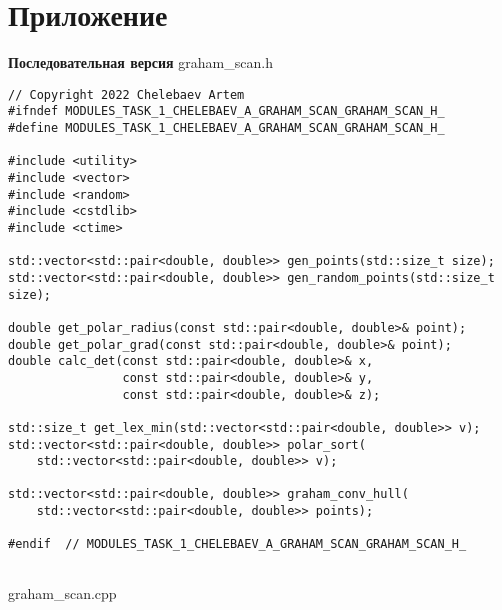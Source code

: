 \documentclass{report}
\begin{document}
\section*{Приложение}
\textbf{Последовательная версия}
\newline
\newline graham\_scan.h
\begin{lstlisting}
// Copyright 2022 Chelebaev Artem
#ifndef MODULES_TASK_1_CHELEBAEV_A_GRAHAM_SCAN_GRAHAM_SCAN_H_
#define MODULES_TASK_1_CHELEBAEV_A_GRAHAM_SCAN_GRAHAM_SCAN_H_

#include <utility>
#include <vector>
#include <random>
#include <cstdlib>
#include <ctime>

std::vector<std::pair<double, double>> gen_points(std::size_t size);
std::vector<std::pair<double, double>> gen_random_points(std::size_t size);

double get_polar_radius(const std::pair<double, double>& point);
double get_polar_grad(const std::pair<double, double>& point);
double calc_det(const std::pair<double, double>& x,
                const std::pair<double, double>& y,
                const std::pair<double, double>& z);

std::size_t get_lex_min(std::vector<std::pair<double, double>> v);
std::vector<std::pair<double, double>> polar_sort(
    std::vector<std::pair<double, double>> v);

std::vector<std::pair<double, double>> graham_conv_hull(
    std::vector<std::pair<double, double>> points);

#endif  // MODULES_TASK_1_CHELEBAEV_A_GRAHAM_SCAN_GRAHAM_SCAN_H_


\end{lstlisting}
graham\_scan.cpp
\end{document}
